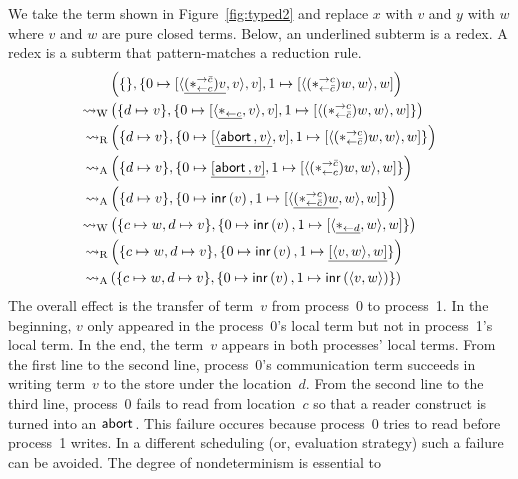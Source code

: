 \begin{example}[Reductions]
 We take the term shown in
 Figure~\ref{fig:typed2} and replace $x$ with $v$ and $y$ with $w$ where
 $v$ and $w$ are pure closed terms.
 Below, an underlined subterm is a redex.  A redex is a subterm that
 pattern-matches a reduction rule.
 \begin{align*}
  &\left(\{\}, \{
  0\mapsto[{\langle{\underline{(\ast^{\rightarrow {\bar{c}}}_{\leftarrow{c}})v},v}\rangle,v}],
  1\mapsto[{\langle{           (\ast^{\rightarrow {c}}_{\leftarrow{\bar{c}}})w ,w}\rangle,w}]
  \right)
  \\   \rightsquigarrow_{\mathrm W} &
  \left( \{d\mapsto v\},
  \{
  0\mapsto [{{\langle{\underline{\ast_{\leftarrow{c}}},  v}\rangle}, v}],
  1\mapsto [{           \langle{(\ast^{\rightarrow {c}}_{\leftarrow{\bar{c}}})w,w}\rangle,w}]
  \}
  \right)
  \\ \rightsquigarrow_{\mathrm R} &
  \left( \{d\mapsto v\},
  \{
  0\mapsto [{\underline{\langle{\mathsf{abort\,},  v}\rangle}, v}],
  1\mapsto [{           \langle{(\ast^{\rightarrow {c}}_{\leftarrow{\bar{c}}})w,w}\rangle,w}]
  \}
  \right)
  \\
  \rightsquigarrow_{\mathrm A} &
  \left(
  \{d\mapsto v\},
  \{
  0\mapsto\underline{[{\mathsf{abort\,},v}]},
  1\mapsto{[{\langle{(\ast^{\rightarrow {\bar{c}}}_{\leftarrow{c}})w,w}\rangle,w}]}
  \}
  \right)
  \\
  \rightsquigarrow_{\mathrm A} &
  \left(\{d\mapsto v\},
  \{
  0\mapsto\mathsf{inr}\left({v}\right),
  1\mapsto[{\langle{\underline{(\ast^{\rightarrow {c}}_{\leftarrow{\bar{c}}})w},w}\rangle,w}]
  \}
  \right)
  \\
  \rightsquigarrow_{\mathrm W} &
  \left(
  \{c\mapsto w, d\mapsto v\}
  ,
  \{
  0\mapsto \mathsf{inr}\left({v}\right),
  1\mapsto [{\langle{\underline{\ast_{\leftarrow{d}}}, w}\rangle, w}]
  \}
  \right)
  \\
  \rightsquigarrow_{\mathrm R} &
  \left(
  \{c\mapsto w, d\mapsto v\}
  ,
  \{
  0\mapsto \mathsf{inr}\left({v}\right),
  1\mapsto \underline{[{\langle{v,w}\rangle,w}]}
  \}
  \right)
  \\
  \rightsquigarrow_{\mathrm A} &
  \left(
  \{c\mapsto w, d\mapsto v\}
  ,
  \{
  0\mapsto \mathsf{inr}\left({v}\right),
  1\mapsto \mathsf{inr}\left({\langle{v,w}\rangle}\right)
  \}
  \right)
 \end{align*}
 The overall effect is the transfer of term~$v$ from process~0 to
 process~1.  In the beginning, $v$ only appeared in the process~0's
 local term but not in process~1's local term.  In the end, the
 term~$v$ appears in both processes' local terms.
 From the first line to the second line,
 process~0's communication term succeeds in writing term~$v$ to the
 store under the location~$d$.
 From the second line to the third line, process~0 fails to read from
 location~$c$ so that a reader construct is turned into an $\mathsf{abort\,}$.
 This failure occures because process~0 tries to read before process~1
 writes.  In a different scheduling (or, evaluation strategy) such a
 failure can be avoided.  The degree of nondeterminism is essential to

\end{example}
